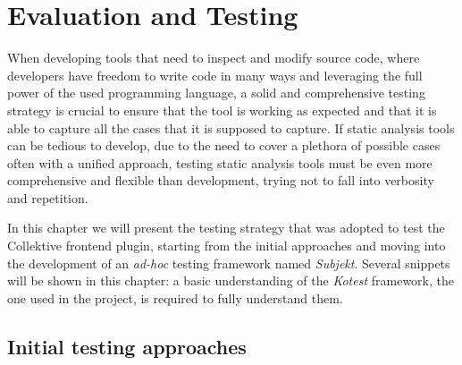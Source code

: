 \documentclass[12pt,a4paper,openright,twoside]{book}
\begin{document}
\chapter{Evaluation and Testing}
\label{chap:evaluation}

When developing tools that need to inspect and modify source code, where
developers have freedom to write code in many ways and leveraging the full power
of the used programming language, a solid and comprehensive testing strategy is
crucial to ensure that the tool is working as expected and that it is able to
capture all the cases that it is supposed to capture.
%
If static analysis tools can be tedious to develop, due to the need to cover a
plethora of possible cases often with a unified approach, testing static
analysis tools must be even more comprehensive and flexible than development,
trying not to fall into verbosity and repetition.

In this chapter we will present the testing strategy that was adopted to test
the Collektive frontend plugin, starting from the initial approaches and moving
into the development of an \emph{ad-hoc} testing framework named \emph{Subjekt}.
Several snippets will be shown in this chapter: a basic understanding of the
\emph{Kotest} framework, the one used in the project, is required to fully
understand them.

\section{Initial testing approaches}
\end{document}
